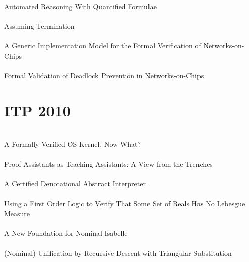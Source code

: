 \documentclass{article}
\begin{document}
\cite{09-greve-quantified} \\
Automated Reasoning With Quantified Formulae \\

\cite{09-greve-termination} \\
Assuming Termination \\

\cite{09-van-der-broek-model} \\
A Generic Implementation Model for the Formal Verification of Networks-on-Chips \\

\cite{09-verbeek} \\
Formal Validation of Deadlock Prevention in Networks-on-Chips \\


\section{ITP 2010}

\cite{10-klein-what} \\
A Formally Verified {OS} Kernel.  Now What? \\

\cite{10-pierce-trenches} \\
Proof Assistants as Teaching Assistants: A View from the Trenches \\

\cite{10-cachera-denotational} \\
A Certified Denotational Abstract Interpreter \\

\cite{10-cowles-lebesgue} \\
Using a First Order Logic to Verify That Some Set of Reals Has No {Lebesgue} Measure \\

\cite{10-huffman-nominal} \\
A New Foundation for Nominal {Isabelle} \\

\cite{10-kumar-unification} \\
(Nominal) Unification by Recursive Descent with Triangular Substitution \\
\end{document}

